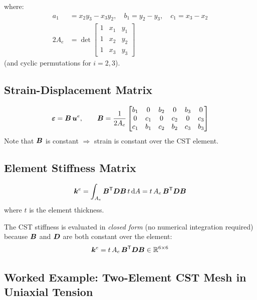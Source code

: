 where:
\begin{align*}
    a_1 &= x_2 y_3 - x_3 y_2, \quad b_1 = y_2 - y_3, \quad c_1 = x_3 - x_2 \\
    2A_e &= \det\begin{bmatrix}1 & x_1 & y_1 \\ 1 & x_2 & y_2 \\ 1 & x_3 & y_3\end{bmatrix}
\end{align*}
(and cyclic permutations for $i=2,3$).

\subsection{Strain-Displacement Matrix}

\begin{equation}
    \bm{\varepsilon} = \bm{B}\, \bm{u}^e, \qquad
    \bm{B} = \frac{1}{2A_e}
    \begin{bmatrix}
        b_1 &  0  & b_2 &  0  & b_3 &  0  \\
         0  & c_1 &  0  & c_2 &  0  & c_3 \\
        c_1 & b_1 & c_2 & b_2 & c_3 & b_3
    \end{bmatrix}
    \label{eq:B_cst}
\end{equation}
Note that $\bm{B}$ is constant $\Rightarrow$ strain is constant over the CST element.

\subsection{Element Stiffness Matrix}

\begin{equation}
    \bm{k}^e = \int_{A_e} \bm{B}^{\mathsf{T}} \bm{D} \bm{B} \,t \,\mathrm{d} A
    = t\, A_e\, \bm{B}^{\mathsf{T}} \bm{D} \bm{B}
    \label{eq:cst_stiffness}
\end{equation}
where $t$ is the element thickness.

\begin{importantbox}
The CST stiffness is evaluated in \emph{closed form} (no numerical integration
required) because $\bm{B}$ and $\bm{D}$ are both constant over the element:
\[
    \bm{k}^e = t\, A_e\, \bm{B}^{\mathsf{T}} \bm{D} \bm{B} \in \mathbb{R}^{6\times6}
\]
\end{importantbox}


\subsection{Worked Example: Two-Element CST Mesh in Uniaxial Tension}
\label{sec:cst_example}

